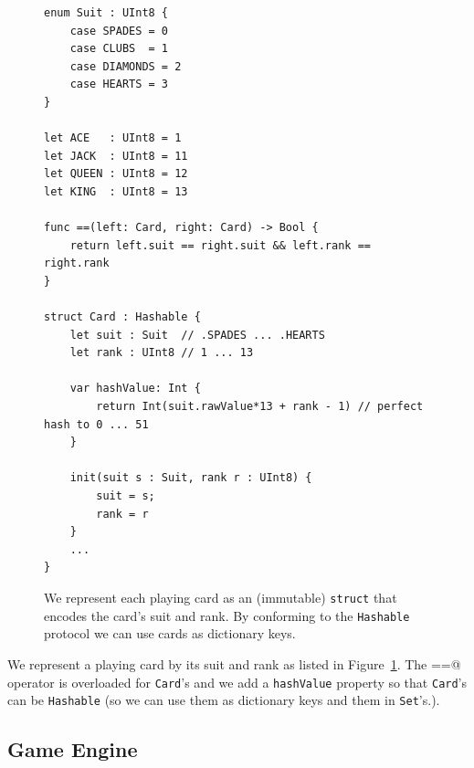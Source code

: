 \documentclass[11pt]{article}
\begin{document}
\begin{figure}[ht!]
\begin{center}
\begin{verbatim}
enum Suit : UInt8 {
    case SPADES = 0
    case CLUBS  = 1
    case DIAMONDS = 2
    case HEARTS = 3
}

let ACE   : UInt8 = 1
let JACK  : UInt8 = 11
let QUEEN : UInt8 = 12
let KING  : UInt8 = 13

func ==(left: Card, right: Card) -> Bool {
    return left.suit == right.suit && left.rank == right.rank
}

struct Card : Hashable {
    let suit : Suit  // .SPADES ... .HEARTS 
    let rank : UInt8 // 1 ... 13
    
    var hashValue: Int {
        return Int(suit.rawValue*13 + rank - 1) // perfect hash to 0 ... 51
    }
    
    init(suit s : Suit, rank r : UInt8) {
        suit = s;
        rank = r
    }
    ...
}
\end{verbatim}
\caption{We represent each playing card as an (immutable) {\tt struct} that encodes 
  the card's suit and rank. By conforming to the {\tt Hashable} protocol 
  we can use cards as dictionary keys.}
\label{fig:Card}
\end{center}
\end{figure}

We represent a playing card by its suit and rank as listed in Figure~\ref{fig:Card}.
The \verb@==@ operator is overloaded for {\tt Card}'s and we add a {\tt hashValue}
property so that {\tt Card}'s can be {\tt Hashable} (so we can use them as dictionary keys
and them in {\tt Set}'s.).

\subsection{Game Engine}
\end{document}
